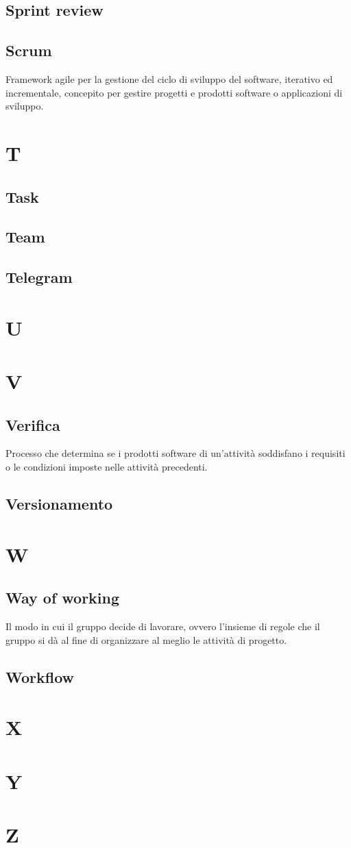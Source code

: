     \subsection{Sprint review} 
    \subsection{Scrum}
    Framework agile per la gestione del ciclo di sviluppo del software, 
    iterativo ed incrementale, concepito per gestire progetti e prodotti software 
    o applicazioni di sviluppo.

\section{T}
    \subsection{Task}
    \subsection{Team}
    \subsection{Telegram}
\section{U}
\section{V}
    \subsection{Verifica}
    Processo che determina se i prodotti software di un'attività soddisfano
    i requisiti o le condizioni imposte nelle attività precedenti.
    \subsection{Versionamento}

\section{W}
    \subsection{Way of working}
    Il modo in cui il gruppo decide di lavorare, ovvero l'insieme di regole 
    che il gruppo si dà al fine di organizzare al meglio le attività di progetto.
    \subsection{Workflow}
\section{X}
\section{Y}
\section{Z}
